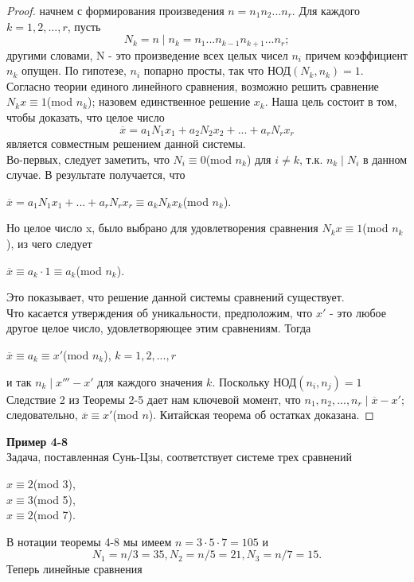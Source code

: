 \documentclass[11pt]{article}
\begin{document}
	\begin{proof}
		 начнем с формирования произведения $n = n_{1}n_{2}...n_{r}$. Для каждого $k = 1,2,...,r$, пусть $$N_{k} = n\mid n_{k} = n_{1} ... n_{k-1}n_{k+1} ... n_{r};$$ другими словами, N - это произведение всех целых чисел $n_{i}$ причем
		 коэффициент $n_{k}$ опущен. По гипотезе, $n_{i}$ попарно просты, так что  НОД$(N_{k}, n_{k}) = 1$. 
		 Согласно теории единого линейного сравнения, возможно решить сравнение $N_{k}x \equiv 1$(mod $n_{k}$); назовем единственное решение $x_{k}$. Наша цель состоит в том, чтобы доказать, что целое число $$\overline{x} = a_{1}N_{1}x_{1} + a_{2}N_{2}x_{2} + ... + a_{r}N_{r}x_{r} $$ является совместным решением данной системы.\\ Во-первых, следует заметить, что $N_{i} \equiv 0$(mod $n_{k}$) для $i \ne k$, т.к. $n_{k} \mid N_{i}$ в данном случае. В результате получается, что
		 \begin{center} 
		 $\overline{x} = a_{1}N_{1}x_{1} + ... + a_{r}N_{r}x_{r} \equiv a_{k}N_{k}x_{k}$(mod $n_{k}$).
		 \end{center}
		 Но целое число x, было выбрано для удовлетворения сравнения $N_{k}x \equiv 1$(mod $n_{k}$), из чего следует
		 \begin{center} 
		 $\overline{x} \equiv a_{k}\cdot 1 \equiv a_{k}$(mod $n_{k}$).
		 \end{center}
		 Это показывает, что решение данной системы сравнений
		 существует.\\
		 Что касается утверждения об уникальности, предположим, что $x'$ - это любое другое
		 целое число, удовлетворяющее этим сравнениям. Тогда
		 \begin{center} 
		 $\overline{x}\equiv a_{k} \equiv x'$(mod $n_{k}$), $k = 1,2,...,r$
		 \end{center}
		  и так $n_{k} \mid x''' - x'$ для каждого значения $k$. Поскольку НОД$(n_{i},n_{j}) = 1$ Следствие 2 из Теоремы 2-5 дает нам ключевой момент, что $n_{1}, n_{2},...,n_{r} \mid \overline{x} - x'$; следовательно, $\overline{x} \equiv x' $(mod $n$). Китайская теорема об остатках доказана.  	
	\end{proof}
	\textbf{Пример 4-8}\\
		Задача, поставленная Сунь-Цзы, соответствует системе трех сравнений
			\begin{center}
			$x \equiv 2$(mod 3),\\
			$x \equiv 3$(mod 5),\\
			$x \equiv 2$(mod 7).	
			\end{center}
		В нотации теоремы 4-8 мы имеем $n = 3 \cdot 5 \cdot 7 = 105$ и $$N_{1} = n/3 = 35, N_{2} = n/5 = 21, N_{3} = n/7 = 15.$$ Теперь линейные сравнения 
\end{document}

